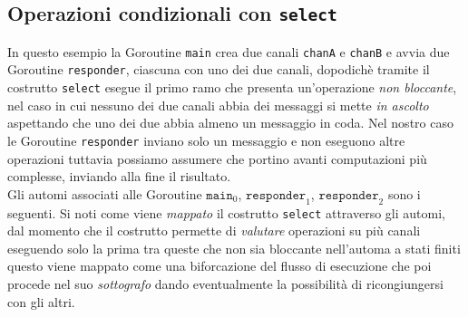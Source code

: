 \subsection{Operazioni condizionali con \texttt{select}}
In questo esempio la Goroutine \texttt{main} crea due canali \texttt{chanA} e \texttt{chanB} e avvia due Goroutine \texttt{responder}, ciascuna con uno dei due canali, dopodichè tramite il costrutto \texttt{select} esegue il primo ramo che presenta un'operazione \emph{non bloccante}, nel caso in cui nessuno dei due canali abbia dei messaggi si mette \emph{in ascolto} aspettando che uno dei due abbia almeno un messaggio in coda. Nel nostro caso le Goroutine \texttt{responder} inviano solo un messaggio e non eseguono altre operazioni tuttavia possiamo assumere che portino avanti computazioni più complesse, inviando alla fine il risultato.\\

Gli automi associati alle Goroutine $\texttt{main}_0$, $\texttt{responder}_1$, $\texttt{responder}_2$ sono i seguenti. Si noti come viene \emph{mappato} il costrutto \texttt{select} attraverso gli automi, dal momento che il costrutto permette di \emph{valutare} operazioni su più canali eseguendo solo la prima tra queste che non sia bloccante nell'automa a stati finiti questo viene mappato come una biforcazione del flusso di esecuzione che poi procede nel suo \emph{sottografo} dando eventualmente la possibilità di ricongiungersi con gli altri.
\begin{figure}[h!]
    \centering
\end{figure}\\
